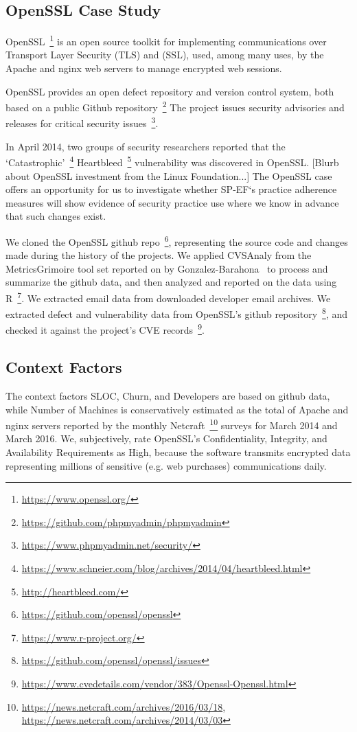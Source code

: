 \subsection{OpenSSL Case Study}
\label{sec:case_openssl}

OpenSSL~\footnote{\url{https://www.openssl.org/}} is an open source toolkit for implementing communications over Transport Layer Security (TLS) and (SSL), used, among many uses, by the Apache and nginx web servers to manage encrypted web sessions.   

OpenSSL provides an open defect repository and version control system, both based on a public Github repository~\footnote{\url{https://github.com/phpmyadmin/phpmyadmin}} The project issues security advisories and releases for critical security issues~\footnote{\url{https://www.phpmyadmin.net/security/}}. 

In April 2014, two groups of security researchers reported that the `Catastrophic'~\footnote{\url{https://www.schneier.com/blog/archives/2014/04/heartbleed.html}} Heartbleed~\footnote{\url{http://heartbleed.com/}} vulnerability was discovered in OpenSSL. [Blurb about OpenSSL investment from the Linux Foundation...] The OpenSSL case offers an opportunity for us to investigate whether SP-EF`s practice adherence measures will show evidence of security practice use where we know in advance that such changes exist.

We cloned the OpenSSL github repo~\footnote{\url{https://github.com/openssl/openssl}}, representing the source code and changes made during the history of the projects. We applied CVSAnaly from the MetricsGrimoire tool set reported on by Gonzalez-Barahona~\cite{barahona2015metrics} to process and summarize the github data, and then analyzed and reported on the data using R~\footnote{\url{https://www.r-project.org/}}. We extracted email data from downloaded developer email archives. We extracted defect and vulnerability data from OpenSSL’s github repository~\footnote{\url{https://github.com/openssl/openssl/issues}}, and checked it against the project’s CVE records~\footnote{\url{https://www.cvedetails.com/vendor/383/Openssl-Openssl.html}}.

\subsection{Context Factors}
The context factors SLOC, Churn, and Developers are based on github data, while Number of Machines is conservatively estimated as the total of Apache and nginx servers reported by the monthly Netcraft~\footnote{\url{https://news.netcraft.com/archives/2016/03/18}, \url{https://news.netcraft.com/archives/2014/03/03}} surveys for March 2014 and March 2016. We, subjectively, rate OpenSSL’s Confidentiality, Integrity, and Availability Requirements as High, because the software transmits encrypted data representing millions of sensitive (e.g. web purchases) communications daily.

